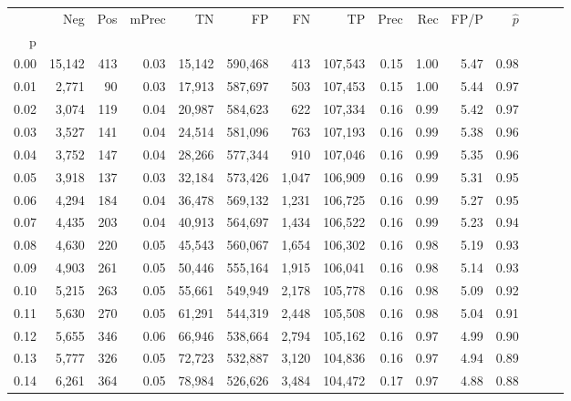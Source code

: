 \begin{tabular}{rrrrrrrrrrrrrrr}
\toprule
{} &     Neg &    Pos & mPrec &       TN &       FP &       FN &       TP &  Prec &   Rec &  FP/P & $\hat{p}$ \\
p    &         &        &       &          &          &          &          &       &       &       &           \\
\midrule
0.00 &  15,142 &    413 &  0.03 &   15,142 &  590,468 &      413 &  107,543 &  0.15 &  1.00 &  5.47 &      0.98 \\
0.01 &   2,771 &     90 &  0.03 &   17,913 &  587,697 &      503 &  107,453 &  0.15 &  1.00 &  5.44 &      0.97 \\
0.02 &   3,074 &    119 &  0.04 &   20,987 &  584,623 &      622 &  107,334 &  0.16 &  0.99 &  5.42 &      0.97 \\
0.03 &   3,527 &    141 &  0.04 &   24,514 &  581,096 &      763 &  107,193 &  0.16 &  0.99 &  5.38 &      0.96 \\
0.04 &   3,752 &    147 &  0.04 &   28,266 &  577,344 &      910 &  107,046 &  0.16 &  0.99 &  5.35 &      0.96 \\
0.05 &   3,918 &    137 &  0.03 &   32,184 &  573,426 &    1,047 &  106,909 &  0.16 &  0.99 &  5.31 &      0.95 \\
0.06 &   4,294 &    184 &  0.04 &   36,478 &  569,132 &    1,231 &  106,725 &  0.16 &  0.99 &  5.27 &      0.95 \\
0.07 &   4,435 &    203 &  0.04 &   40,913 &  564,697 &    1,434 &  106,522 &  0.16 &  0.99 &  5.23 &      0.94 \\
0.08 &   4,630 &    220 &  0.05 &   45,543 &  560,067 &    1,654 &  106,302 &  0.16 &  0.98 &  5.19 &      0.93 \\
0.09 &   4,903 &    261 &  0.05 &   50,446 &  555,164 &    1,915 &  106,041 &  0.16 &  0.98 &  5.14 &      0.93 \\
0.10 &   5,215 &    263 &  0.05 &   55,661 &  549,949 &    2,178 &  105,778 &  0.16 &  0.98 &  5.09 &      0.92 \\
0.11 &   5,630 &    270 &  0.05 &   61,291 &  544,319 &    2,448 &  105,508 &  0.16 &  0.98 &  5.04 &      0.91 \\
0.12 &   5,655 &    346 &  0.06 &   66,946 &  538,664 &    2,794 &  105,162 &  0.16 &  0.97 &  4.99 &      0.90 \\
0.13 &   5,777 &    326 &  0.05 &   72,723 &  532,887 &    3,120 &  104,836 &  0.16 &  0.97 &  4.94 &      0.89 \\
0.14 &   6,261 &    364 &  0.05 &   78,984 &  526,626 &    3,484 &  104,472 &  0.17 &  0.97 &  4.88 &      0.88 \\

\end{tabular}
